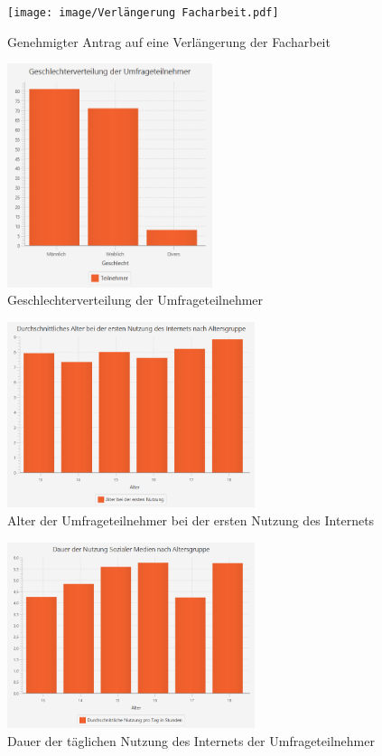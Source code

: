 \begin{figure}[hb]
    \centering
    \texttt{[image: image/Verlängerung Facharbeit.pdf]}
    \caption{\label{imgs:verlaengerung}Genehmigter Antrag auf eine Verlängerung der Facharbeit}
\end{figure}

\begin{figure}[ht]
    \centering
    \includegraphics[width=6cm]{image/Diagramm Geschlechterverteilung.png}
    \caption{\label{imgs:diagramm_geschlechter}Geschlechterverteilung der Umfrageteilnehmer}
\end{figure}

\begin{figure}[ht]
    \centering
    \includegraphics[width=7.25cm]{image/Diagramm Alter bei der ersten Nutzung.png}
    \caption{\label{imgs:diagramm_erste_nutzung}Alter der Umfrageteilnehmer bei der ersten Nutzung des Internets}
\end{figure}

\begin{figure}[ht]
    \centering
    \includegraphics[width=7.25cm]{image/Diagramm Dauer der Nutzung.png}
    \caption{\label{imgs:diagramm_dauer}Dauer der täglichen Nutzung des Internets der Umfrageteilnehmer}
\end{figure}

